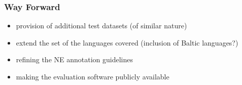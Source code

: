 \documentclass{beamer}
\begin{document}
\begin{frame}
\begin{table}[t]
\begin{minipage}{\linewidth}
  \end{minipage}%
\end{table}

\end{frame}


\begin{frame}
 \frametitle{Way Forward}

\begin{itemize}

\item provision of additional test datasets (of similar nature)

\vspace{0.2cm}

\item extend the set of the languages covered (inclusion of Baltic languages?)

\vspace{0.2cm}

\item refining the NE annotation guidelines

\vspace{0.2cm}

\item making the evaluation software publicly available

\end{itemize}

\end{frame}
\end{document}
